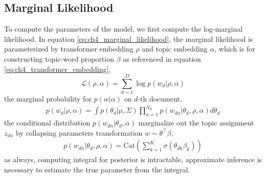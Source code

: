 \subsection{Marginal Likelihood}
To compute the parameters of the model, we first compute the log-marginal likelihood. In equation \ref{eq:ch4_marginal_likelihood}, the marginal likelihood is parameterized by transformer embedding $ \rho $ and topic embedding $ \alpha $, which is for constructing topic-word proportion $ \beta $ as referenced in equation \ref{eq:ch4_transformer_embedding},
\begin{equation}\label{eq:ch4_marginal_likelihood}
\mathcal{L}(\rho,\alpha)=\sum_{d=1}^{D}\log p(w_d|\rho,\alpha)
\end{equation}
the marginal probability for $ p(w|\alpha) $ on $ d $-th document,
\begin{align}
p(w_d|\rho,\alpha)=\int p(\theta_d|\mu,\Sigma)\prod_{n=1}^{N_d}p(w_{dn}|\theta_d,\rho,\alpha)d\theta_d
\end{align}
the conditional distribution $ p(w_{dn}|\theta_d,\alpha) $ marginalize out the topic assignment $ z_{dn} $ by collapsing parameters transformation $ w\sim \theta^\top\beta $,
\begin{align}
p(w_{dn}|\theta_d,\rho,\alpha)=\text{Cat}\left(\sum_{k=1}^{K}\sigma(\theta_{dk}\beta_{k})\right)
\end{align}
as always, computing integral for posterior is intractable, approximate inference is necessary to estimate the true parameter from the integral.

